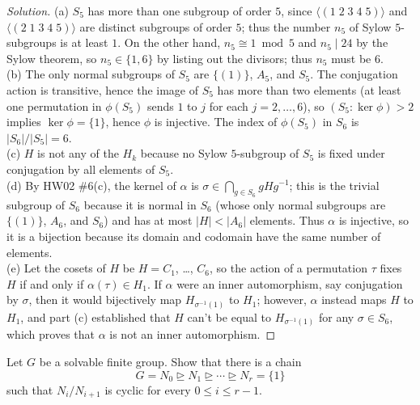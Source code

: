 \documentclass[10pt]{article}
\providecommand{\inv}{^{-1}}
\newenvironment{soln}{\begin{proof}[Solution]}{\end{proof}}
\providecommand{\abs}[1]{\left|#1\right|}
\begin{document}
\begin{soln}
    (a) $S_5$ has more than one subgroup of order $5$,
    since $\langle (1\;2\;3\;4\;5)\rangle$ and $\langle(2\;1\;3\;4\;5)\rangle$
    are distinct subgroups of order $5$; thus the number $n_5$
    of Sylow $5$-subgroups is at least $1$. On the other hand,
    $n_5\cong 1\bmod 5$ and $n_5\mid 24$ by the Sylow theorem,
    so $n_5\in\{1,6\}$ by listing out the divisors; thus $n_5$ must be $6$.
    \\

    (b) The only normal subgroups of $S_5$ are $\{(1)\}$, $A_5$, and $S_5$.
    The conjugation action is transitive, hence the image of $S_5$
    has more than two elements (at least one permutation in $\phi(S_5)$
    sends $1$ to $j$ for each $j=2,\dots,6$), so $(S_5 : \ker\phi) > 2$
    implies $\ker\phi = \{1\}$, hence $\phi$ is injective.
    The index of $\phi(S_5)$ in $S_6$ is $\abs{S_6}/\abs{S_5} = 6$.
    \\

    (c) $H$ is not any of the $H_k$ because no Sylow $5$-subgroup
    of $S_5$ is fixed under conjugation by all elements of $S_5$.
    \\

    (d) By HW02 \#6(c), the kernel of $\alpha$ is
    $\sigma\in \bigcap_{g\in S_6}gHg\inv$; this is
    the trivial subgroup of $S_6$ because it is normal in $S_6$
    (whose only normal subgroups are $\{(1)\}$, $A_6$, and $S_6$)
    and has at most $\abs H < \abs{A_6}$ elements.
    Thus $\alpha$ is injective, so it is a bijection
    because its domain and codomain have the same number of elements.
    \\

    (e) Let the cosets of $H$ be $H = C_1$, \dots, $C_6$,
    so the action of a permutation $\tau$ fixes $H$ if and only if
    $\alpha(\tau) \in H_1$.
    If $\alpha$ were an inner automorphism, say conjugation by $\sigma$,
    then it would bijectively map $H_{\sigma\inv(1)}$ to $H_{1}$;
    however, $\alpha$ instead maps $H$ to $H_1$, and
    part (c) established that $H$ can't be equal to $H_{\sigma\inv(1)}$
    for any $\sigma\in S_6$, which proves that
    $\alpha$ is not an inner automorphism.
\end{soln}

\pagebreak

\begin{problem}
    Let $G$ be a solvable finite group. Show that there is a chain
    \begin{equation*}
	G = N_0\trianglerighteq N_1\trianglerighteq\cdots\trianglerighteq N_r=\{1\}
    \end{equation*}
    such that $N_i/N_{i+1}$ is cyclic for every $0\le i\le r-1$.
\end{problem}
\end{document}
